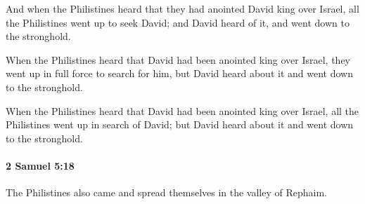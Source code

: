 			\begin{versebox}
					\item[BHS] 
					\item[ASV] And when the Philistines heard that they had anointed David king over Israel, all the Philistines went up to seek David; and David heard of it, and went down to the stronghold.
					\item[NIV] When the Philistines heard that David had been anointed king over Israel, they went up in full force to search for him, but David heard about it and went down to the stronghold.
					\item[NRSV] When the Philistines heard that David had been anointed king over Israel, all the Philistines went up in search of David; but David heard about it and went down to the stronghold.
			\end{versebox}

		\paragraph{2 Samuel 5:18} %
			\label{2SAMUEL-5-18}

			The Philistines also came and spread themselves in the valley of Rephaim.

